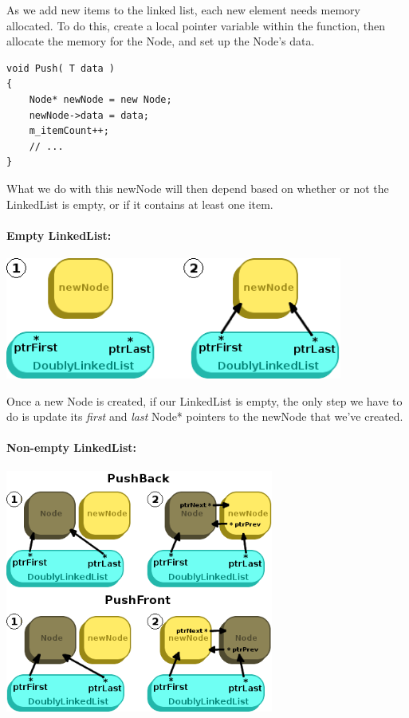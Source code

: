 \documentclass[a4paper,12pt,oneside]{book}
\begin{document}
        As we add new items to the linked list, each new element needs memory allocated.
        To do this, create a local pointer variable within the function, then allocate the 
        memory for the Node, and set up the Node's data.
        
\begin{lstlisting}[style=code]
void Push( T data )
{
    Node* newNode = new Node;
    newNode->data = data;
    m_itemCount++;
    // ...
}
\end{lstlisting}
    
        What we do with this newNode will then depend based on whether or not the
        LinkedList is empty, or if it contains at least one item.
        
        \paragraph{Empty LinkedList:}
        
            \begin{center}
                \includegraphics[height=4cm]{images/linkedlist-empty-newnode.png}
            \end{center}
            
            Once a new Node is created, if our LinkedList is empty, the only step
            we have to do is update its \textit{first} and \textit{last} Node* pointers
            to the newNode that we've created.
        
        \paragraph{Non-empty LinkedList:}
        
            \begin{center}
                \includegraphics[height=8cm]{images/linkedlist-existing-newnode.png}
            \end{center}
            
\end{document}
